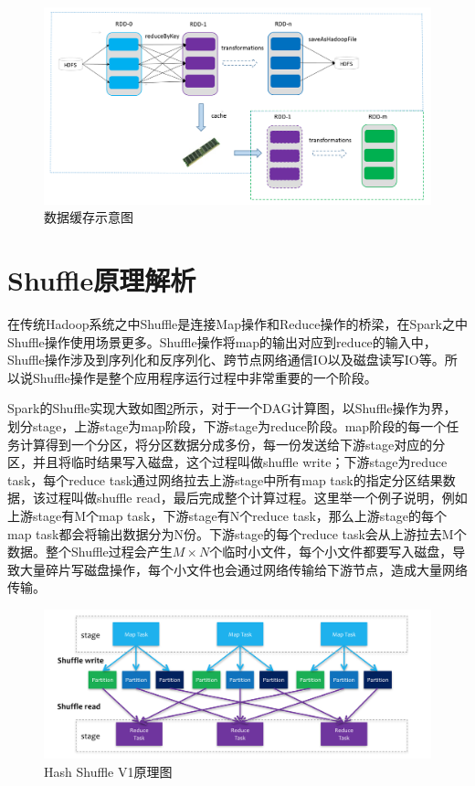 \begin{figure}[htbp]
    \centering
    \includegraphics[width=1\textwidth]{Img/rdd-cache.png}
    \caption{数据缓存示意图}
    \label{fig:rdd-cache}
\end{figure}

\section{Shuffle原理解析}

在传统Hadoop系统之中Shuffle是连接Map操作和Reduce操作的桥梁，在Spark之中Shuffle操作使用场景更多。Shuffle操作将map的输出对应到reduce的输入中，Shuffle操作涉及到序列化和反序列化、跨节点网络通信IO以及磁盘读写IO等。所以说Shuffle操作是整个应用程序运行过程中非常重要的一个阶段。

Spark的Shuffle实现大致如图\ref{fig:shuffle-overview}所示，对于一个DAG计算图，以Shuffle操作为界，划分stage，上游stage为map阶段，下游stage为reduce阶段。map阶段的每一个任务计算得到一个分区，将分区数据分成多份，每一份发送给下游stage对应的分区，并且将临时结果写入磁盘，这个过程叫做shuffle write；下游stage为reduce task，每个reduce task通过网络拉去上游stage中所有map task的指定分区结果数据，该过程叫做shuffle read，最后完成整个计算过程。这里举一个例子说明，例如上游stage有M个map task，下游stage有N个reduce task，那么上游stage的每个map task都会将输出数据分为N份。下游stage的每个reduce task会从上游拉去M个数据。整个Shuffle过程会产生$M \times N$个临时小文件，每个小文件都要写入磁盘，导致大量碎片写磁盘操作，每个小文件也会通过网络传输给下游节点，造成大量网络传输。

\begin{figure}[htbp]
    \centering
    \includegraphics[width=1\textwidth]{Img/spark-shuffle-overview.png}
    \caption{Hash Shuffle V1原理图}
    \label{fig:shuffle-overview}
\end{figure}

